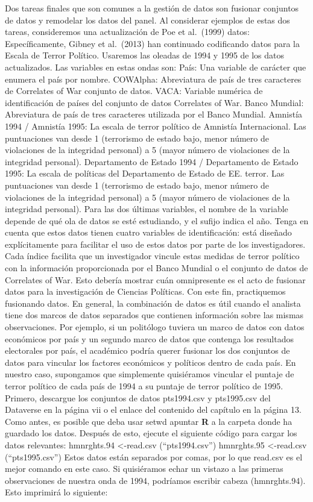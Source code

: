 \documentclass[
]{book}
\begin{document}
Dos tareas finales que son comunes a la gestión de datos son fusionar conjuntos de datos y remodelar los datos del panel. Al considerar ejemplos de estas dos tareas, consideremos una actualización de Poe et al.~(1999) datos: Específicamente, Gibney et al.~(2013) han continuado codificando datos para la Escala de Terror Político. Usaremos las oleadas de 1994 y 1995 de los datos actualizados. Las variables en estas ondas son:
País: Una variable de carácter que enumera el país por nombre.
COWAlpha: Abreviatura de país de tres caracteres de Correlates of War
conjunto de datos.
VACA: Variable numérica de identificación de países del conjunto de datos Correlates of War.
Banco Mundial: Abreviatura de país de tres caracteres utilizada por el Banco Mundial.
Amnistía 1994 / Amnistía 1995: La escala de terror político de Amnistía Internacional.
Las puntuaciones van desde 1 (terrorismo de estado bajo, menor número de violaciones de la integridad personal) a 5 (mayor número de violaciones de la integridad personal).
Departamento de Estado 1994 / Departamento de Estado 1995: La escala de políticas del Departamento de Estado de EE. terror. Las puntuaciones van desde 1 (terrorismo de estado bajo, menor número de violaciones de la integridad personal) a 5 (mayor número de violaciones de la integridad personal).
Para las dos últimas variables, el nombre de la variable depende de qué ola de datos se esté estudiando, y el sufijo indica el año. Tenga en cuenta que estos datos tienen cuatro variables de identificación: está diseñado explícitamente para facilitar el uso de estos datos por parte de los investigadores. Cada índice facilita que un investigador vincule estas medidas de terror político con la información proporcionada por el Banco Mundial o el conjunto de datos de Correlates of War.
Esto debería mostrar cuán omnipresente es el acto de fusionar datos para la investigación de Ciencias Políticas.
Con este fin, practiquemos fusionando datos. En general, la combinación de datos es útil cuando el analista tiene dos marcos de datos separados que contienen información sobre las mismas observaciones. Por ejemplo, si un politólogo tuviera un marco de datos con datos económicos por país y un segundo marco de datos que contenga los resultados electorales por país, el académico podría querer fusionar los dos conjuntos de datos para vincular los factores económicos y políticos dentro de cada país. En nuestro caso, supongamos que simplemente quisiéramos vincular el puntaje de terror político de cada país de 1994 a su puntaje de terror político de
1995. Primero, descargue los conjuntos de datos pts1994.csv y pts1995.csv del Dataverse en
la página vii o el enlace del contenido del capítulo en la página 13. Como antes, es posible que deba usar setwd apuntar \textbf{R} a la carpeta donde ha guardado los datos. Después de esto, ejecute el siguiente código para cargar los datos relevantes:
hmnrghts.94 \textless-read.csv (``pts1994.csv'') hmnrghts.95 \textless-read.csv (``pts1995.csv'')
Estos datos están separados por comas, por lo que read.csv es el mejor comando en este caso.
Si quisiéramos echar un vistazo a las primeras observaciones de nuestra onda de 1994, podríamos escribir cabeza (hmnrghts.94). Esto imprimirá lo siguiente:
\end{document}
